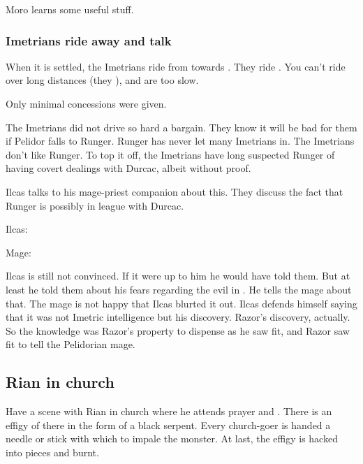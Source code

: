 Moro learns some useful stuff. 





\subsubsection{Imetrians ride away and talk}
When it is settled, the Imetrians ride from \Malcur towards \Forclin. 
They ride \relcs. 
You can't ride \nycans{} over long distances (they ), and \mulgrons{} are too slow. 

Only minimal concessions were given. 

The Imetrians did not drive so hard a bargain. 
They know it will be bad for them if Pelidor falls to Runger. 
Runger has never let many Imetrians in. 
The Imetrians don't like Runger. 
To top it off, the Imetrians have long suspected Runger of having covert dealings with Durcac, albeit without proof. 

Ilcas talks to his mage-priest companion about this. 
They discuss the fact that Runger is possibly in league with Durcac. 

\begin{prose}
  Ilcas: 
  
  Mage: 
\end{prose}

Ilcas is still not convinced. 
If it were up to him he would have told them. 
But at least he told them about his fears regarding the evil in \Malcur. 
He tells the mage about that. 
The mage is not happy that Ilcas blurted it out. 
Ilcas defends himself saying that it was not Imetric intelligence but his discovery. 
Razor's discovery, actually. 
So the knowledge was Razor's property to dispense as he saw fit, and Razor saw fit to tell the Pelidorian mage. 









\subsection{Rian in church}
Have a scene with Rian in church where he attends prayer and . 
There is an effigy of \Isphet there in the form of a black serpent. 
Every church-goer is handed a needle or stick with which to impale the monster. 
At last, the effigy is hacked into pieces and burnt. 

